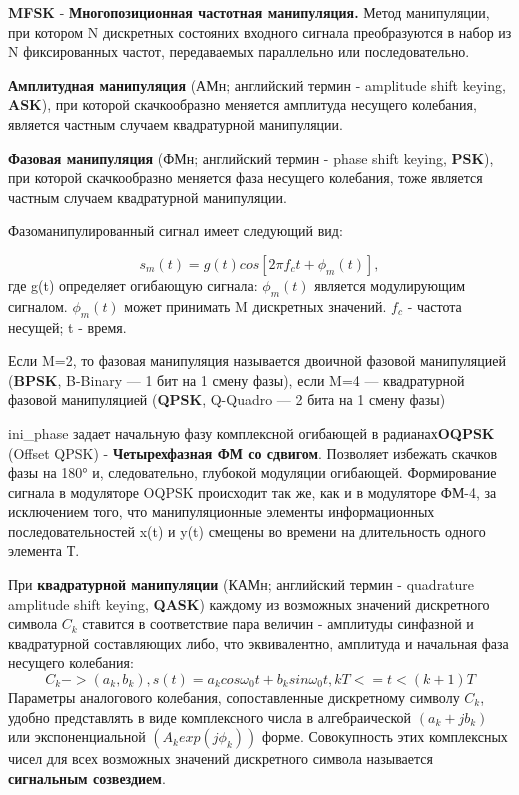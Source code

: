 \documentclass[12pt,a4paper]{scrartcl}
\begin{document}
\textbf{MFSK} - \textbf{Многопозиционная частотная манипуляция.} Метод манипуляции, при котором N дискретных состояних входного сигнала преобразуются в набор из N фиксированных частот, передаваемых параллельно или последовательно.

\textbf{Амплитудная манипуляция} (АМн; английский термин - amplitude shift keying, \textbf{ASK}), при которой скачкообразно меняется амплитуда несущего колебания, является частным случаем квадратурной манипуляции.

\textbf{Фазовая манипуляция} (ФМн; английский термин - phase shift keying, \textbf{PSK}), при которой скачкообразно меняется фаза несущего колебания, тоже является частным случаем квадратурной манипуляции.

Фазоманипулированный сигнал имеет следующий вид:

$$s_m(t)=g(t)cos[2\pi f_c t +\phi_m (t)],$$
где g(t) определяет огибающую сигнала: $\phi_m (t)$ является модулирующим сигналом. $\phi_m (t)$ может принимать M дискретных значений. $f_c$ - частота несущей; t - время.

Если M=2, то фазовая манипуляция называется двоичной фазовой манипуляцией (\textbf{BPSK}, B-Binary — 1 бит на 1 смену фазы), если M=4 — квадратурной фазовой манипуляцией (\textbf{QPSK}, Q-Quadro — 2 бита на 1 смену фазы)

ini_phase задает начальную фазу комплексной огибающей в радианах\textbf{OQPSK} (Offset QPSK) - \textbf{Четырехфазная ФМ со сдвигом}. Позволяет избежать скачков фазы на 180° и, следовательно, глубокой модуляции огибающей. Формирование сигнала в модуляторе OQPSK происходит так же, как и в модуляторе ФМ-4, за исключением того, что манипуляционные элементы информационных последовательностей x(t) и y(t) смещены во времени на длительность одного элемента Т.

При \textbf{квадратурной манипуляции} (КАМн; английский термин - quadrature amplitude shift keying, \textbf{QASK}) каждому из возможных значений дискретного символа $C_k$ ставится в соответствие пара величин - амплитуды синфазной и квадратурной составляющих либо, что эквивалентно, амплитуда и начальная фаза несущего колебания:
$$C_k->(a_k,b_k), s(t)=a_k cos \omega_0 t+b_k sin \omega_0 t, kT<=t<(k+1)T$$
Параметры аналогового колебания, сопоставленные дискретному символу $C_k$,
удобно представлять в виде комплексного числа в алгебраической $(a_k + jb_k)$ или
экспоненциальной $(A_k exp(j \phi_k))$ форме. Совокупность этих комплексных чисел для всех возможных значений дискретного символа называется \textbf{сигнальным созвездием}.
\end{document}
